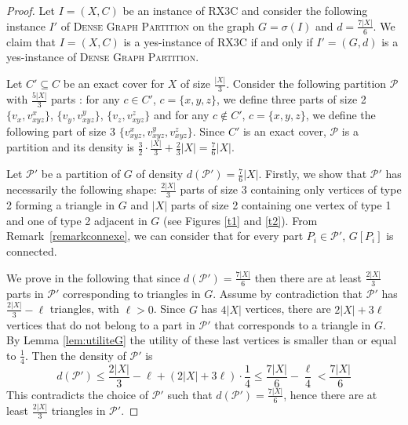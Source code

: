\documentclass[a4paper,USenglish,cleveref, autoref]{lipics-v2021}
\newcommand\DGP{\textsc{Dense Graph Partition}}
\begin{document}
\begin{proof}
Let $I=(X,C)$ be an instance of RX3C and consider the following instance $I'$ of \DGP{} on the graph $G=\sigma(I)$ and $d=\frac{7|X|}{6}$. 
We claim that $I=(X,C)$ is a yes-instance of RX3C if and only if $I'=(G,d)$ is a yes-instance of \DGP. 

\medskip
  Let $C' \subseteq C$ be an exact cover for $X$ of size $\frac{|X|}{3}$. Consider the following partition $\mathcal{P}$ with $\frac{5|X|}{3}$ parts : for any $c \in C'$, $c=\{x,y,z\}$, we define three parts of size 2 $\{v_x, v_{xyz}^x\}$, $\{v_y, v_{xyz}^y\}$, $\{v_z, v_{xyz}^z\}$ and for any $c \notin C'$, $c=\{x,y,z\}$, we define the following part of size 3  $\{v_{xyz}^x, v_{xyz}^y, v_{xyz}^z\}$. Since $C'$ is an exact cover, $\mathcal{P}$ is a partition and its density is $\frac{3}{2}\cdot\frac{|X|}{3} + \frac{2}{3}|X| = \frac{7}{6}|X|$.
\medskip

Let $\mathcal{P'}$ be a partition of $G$ of density $d(\mathcal{P'})=\frac{7}{6}|X|$. Firstly, we show  that $\mathcal{P'}$ has necessarily the following shape: $\frac{2|X|}{3}$ parts of size 3 containing only vertices of type 2 forming a triangle in $G$ and $|X|$ parts of size 2 containing one vertex of type 1 and one of type 2 adjacent in $G$ (see Figures \ref{t1} and \ref{t2}). From Remark~\ref{remarkconnexe}, we can consider that   for every part $P_i \in \mathcal{P'}$, $G[P_i]$ is connected.  

We  prove in the following  that since $d(\mathcal{P'})=\frac{7|X|}{6}$ then there are at least $\frac{2|X|}{3}$ parts in $\mathcal{P'}$ corresponding to triangles in $G$.  
Assume by contradiction that $\mathcal{P'}$ has $\frac{2|X|}{3} - \ell $ triangles, with $\ell > 0$. Since $G$ has $4|X|$ vertices, there are $2|X|+ 3 \ell$ vertices that do not belong to a part in $\mathcal{P'}$ that corresponds to a triangle in $G$.  By Lemma \ref{lem:utiliteG} the utility of these last vertices  is smaller than or equal to $\frac{1}{4}$. Then the density of $\mathcal{P'}$ is 
\[
    d(\mathcal{P}') \leq   \frac{2|X|}{3} - \ell + (2|X|+ 3 \ell) \cdot\frac{1}{4}  \leq  \frac{7|X|}{6} - \frac{\ell}{4}  < \frac{7|X|}{6}
\]
This contradicts the choice of  $\mathcal{P'}$ such that   $d(\mathcal{P'})=\frac{7|X|}{6}$, hence there are at least $\frac{2|X|}{3}$ triangles in $\mathcal{P'}$.


\end{proof}
\end{document}

